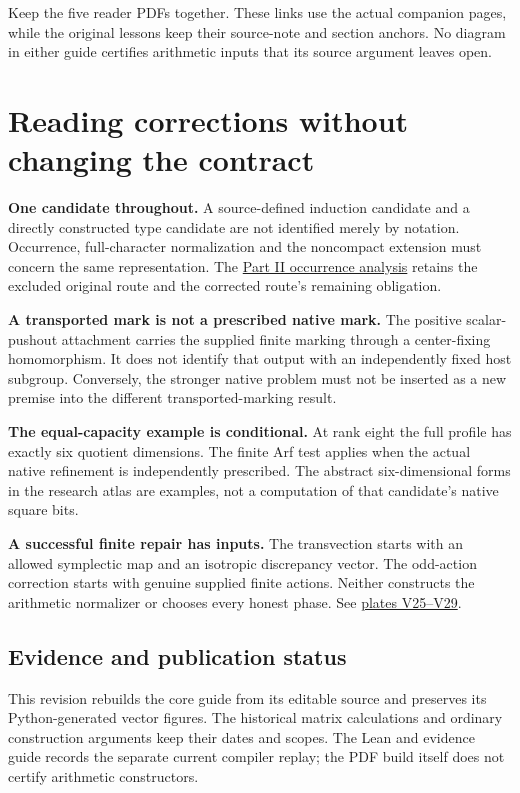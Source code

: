 Keep the five reader PDFs together. These links use the actual companion pages, while the original lessons keep their source-note and section anchors. No diagram in either guide certifies arithmetic inputs that its source argument leaves open.
\clearpage
\section*{Reading corrections without changing the contract}
{}
\textbf{One candidate throughout.} A source-defined induction candidate and a directly constructed type candidate are not identified merely by notation. Occurrence, full-character normalization and the noncompact extension must concern the same representation. The \href{https://komorebi.invalid/b07/visual_occurrence}{Part II occurrence analysis} retains the excluded original route and the corrected route's remaining obligation.

\textbf{A transported mark is not a prescribed native mark.} The positive scalar-pushout attachment carries the supplied finite marking through a center-fixing homomorphism. It does not identify that output with an independently fixed host subgroup. Conversely, the stronger native problem must not be inserted as a new premise into the different transported-marking result.

\textbf{The equal-capacity example is conditional.} At rank eight the full profile has exactly six quotient dimensions. The finite Arf test applies when the actual native refinement is independently prescribed. The abstract six-dimensional forms in the research atlas are examples, not a computation of that candidate's native square bits.

\textbf{A successful finite repair has inputs.} The transvection starts with an allowed symplectic map and an isotropic discrepancy vector. The odd-action correction starts with genuine supplied finite actions. Neither constructs the arithmetic normalizer or chooses every honest phase. See \href{https://komorebi.invalid/b07/visual_repairs}{plates V25--V29}.

\subsection*{Evidence and publication status}
This revision rebuilds the core guide from its editable source and preserves its Python-generated vector figures. The historical matrix calculations and ordinary construction arguments keep their dates and scopes. The Lean and evidence guide records the separate current compiler replay; the PDF build itself does not certify arithmetic constructors.

